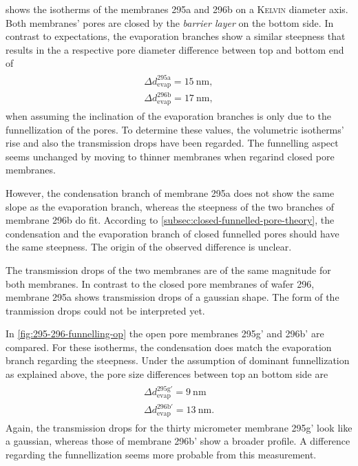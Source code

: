\documentclass[../thesis.tex]{subfiles}
\begin{document}
    

     shows the isotherms  of the membranes 295a and 296b on a \textsc{Kelvin} diameter axis. Both membranes' pores are closed by the \textit{barrier layer} on the bottom side. In contrast to expectations, the evaporation branches show a similar steepness that results in the a respective pore diameter difference between top and bottom end of
    \begin{align}
      \begin{split}
        \Delta d_\mathrm{evap}^\mathrm{295a}=\SI{15}{\nano\meter}, \\
        \Delta d_\mathrm{evap}^\mathrm{296b}=\SI{17}{\nano\meter},
      \end{split}
    \end{align}
    when assuming the inclination of the evaporation branches is only due to the funnellization of the pores. To determine these values, the volumetric isotherms' rise and also the transmission drops have been regarded. The funnelling aspect seems unchanged by moving to thinner membranes when regarind closed pore membranes.

    However, the condensation branch of membrane 295a does not show the same slope as the evaporation branch, whereas the steepness of the two branches of membrane 296b do fit. According to \cref{subsec:closed-funnelled-pore-theory}, the condensation and the evaporation branch of closed funnelled pores should have the same steepness. The origin of the observed difference is unclear.

    The transmission drops of the two membranes are of the same magnitude for both membranes. In contrast to the closed pore membranes of wafer 296, membrane 295a shows transmission drops of a gaussian shape. The form of the tranmission drops could not be interpreted yet.
    \medskip

    In \cref{fig:295-296-funnelling-op} the open pore membranes 295g' and 296b' are compared. For these isotherms, the condensation does match the evaporation branch regarding the steepness.  Under the assumption of dominant funnellization as explained above, the pore size differences between top an bottom side are
    \begin{align}
      \begin{split}
        \Delta d_\mathrm{evap}^\mathrm{295g'}=\SI{9}{\nano\meter} \\
        \Delta d_\mathrm{evap}^\mathrm{296b'}=\SI{13}{\nano\meter}.
      \end{split}
    \end{align}
    Again, the transmission drops for the thirty micrometer membrane 295g' look like a gaussian, whereas those of membrane 296b' show a broader profile. A difference regarding the funnellization seems more probable from this measurement.
\end{document}
